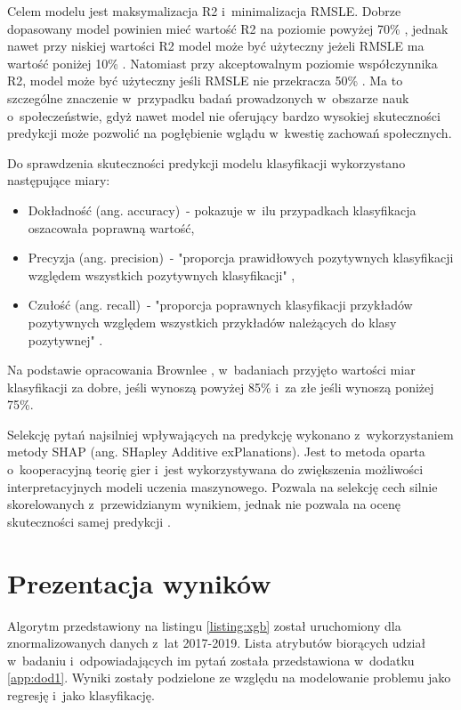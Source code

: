 Celem modelu jest maksymalizacja R2 i~minimalizacja RMSLE. Dobrze dopasowany model powinien mieć wartość R2 na poziomie powyżej 70\% \cite{r2-good-value}, jednak nawet przy niskiej wartości R2 model może być użyteczny jeżeli RMSLE ma wartość poniżej 10\% \cite{r2-vs-rmse}.
Natomiast przy akceptowalnym poziomie współczynnika R2, model może być użyteczny jeśli RMSLE nie przekracza 50\% \cite{rmse-good-value}.
Ma to szczególne znaczenie w~przypadku badań prowadzonych w~obszarze nauk o~społeczeństwie, gdyż nawet model nie oferujący bardzo wysokiej skuteczności predykcji może pozwolić na pogłębienie wglądu w~kwestię zachowań społecznych.

Do sprawdzenia skuteczności predykcji modelu klasyfikacji wykorzystano następujące miary:
\begin{itemize}
    \item Dokładność (ang. accuracy)~- pokazuje w~ilu przypadkach klasyfikacja oszacowała poprawną wartość,
    \item Precyzja (ang. precision)~- "proporcja prawidłowych pozytywnych klasyfikacji względem wszystkich pozytywnych klasyfikacji" \cite{recall-precision},
    \item Czułość (ang. recall)~- "proporcja poprawnych klasyfikacji przykładów pozytywnych względem wszystkich przykładów należących do klasy pozytywnej" \cite{recall-precision}.
\end{itemize}

Na podstawie opracowania Brownlee \cite{accuracy-level}, w~badaniach przyjęto wartości miar klasyfikacji za dobre, jeśli wynoszą powyżej 85\% i~za złe jeśli wynoszą poniżej 75\%.

Selekcję pytań najsilniej wpływających na predykcję wykonano z~wykorzystaniem metody SHAP (ang. SHapley Additive exPlanations).
Jest to metoda oparta o~kooperacyjną teorię gier i~jest wykorzystywana do zwiększenia możliwości interpretacyjnych modeli uczenia maszynowego.
Pozwala na selekcję cech silnie skorelowanych z~przewidzianym wynikiem, jednak nie pozwala na ocenę skuteczności samej predykcji \cite{shap}.


\section{Prezentacja wyników}\label{sec:analysis:important-features}

Algorytm przedstawiony na listingu \ref{listing:xgb} został uruchomiony dla znormalizowanych danych z~lat 2017-2019.
Lista atrybutów biorących udział w~badaniu i~odpowiadających im pytań została przedstawiona w~dodatku \ref{app:dod1}.
Wyniki zostały podzielone ze względu na modelowanie problemu jako regresję i~jako klasyfikację.

